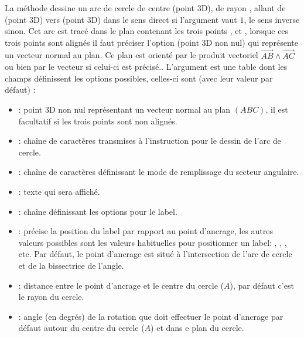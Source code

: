 La méthode  dessine un arc de cercle de centre  (point 3D), de rayon , allant de  (point 3D) vers  (point 3D) dans le sens direct si l'argument  vaut $1$, le sens inverse sinon. Cet arc est tracé dans le plan contenant les trois points ,  et , lorsque ces trois points sont alignés il faut préciser l'option  (point 3D non nul) qui représente un vecteur normal au plan. Ce plan est orienté par le produit vectoriel $\vec{AB}\wedge\vec{AC}$ ou bien par le vecteur  si celui-ci est précisé.. L'argument est une table dont les champs définissent les options possibles, celles-ci sont (avec leur valeur par défaut) :
\begin{itemize}
    \item {} : point 3D non nul représentant un vecteur normal au plan $(ABC)$, il est facultatif si les trois points sont non alignés.
    
    \item {} : chaîne de caractères transmises à l'instruction \drawcmd pour le dessin de l'arc de cercle.
    
    \item {} : chaîne de caractères définissant le mode de remplissage du secteur angulaire.
    
    \item {} : texte qui sera affiché.
    
    \item {} : chaîne définissant les options pour le label.
    
    \item {} : précise la position du label par rapport au point d'ancrage, les autres valeurs possibles sont les valeurs habituelles pour positionner un label: , , , etc. Par défaut, le point d'ancrage est situé à l'intersection de l'arc de cercle et de la bissectrice de l'angle.
    
    \item {} : distance entre le point d'ancrage et le centre du cercle ($A$), par défaut c'est le rayon  du cercle.
    
    \item {} : angle (en degrés) de la rotation que doit effectuer le point d'ancrage par défaut autour du centre du cercle ($A$) et dans e plan du cercle.
    

\end{itemize}
